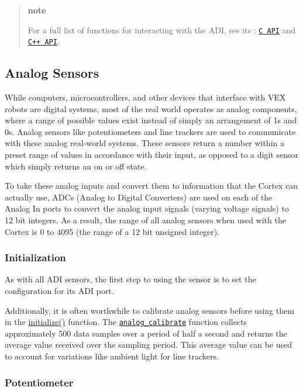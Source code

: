 \begin{quote}
{\bfseries note}

For a full list of functions for interacting with the A\+DI, see its \+: \href{../../api/c/adi.html}{\tt C A\+PI} and \href{../../api/cpp/adi.html}{\tt C++ A\+PI}. \end{quote}


\subsection*{Analog Sensors}

While computers, microcontrollers, and other devices that interface with V\+EX robots are digital systems, most of the real world operates as analog components, where a range of possible values exist instead of simply an arrangement of 1s and 0s. Analog sensors like potentiometers and line trackers are used to communicate with these analog real-\/world systems. These sensors return a number within a preset range of values in accordance with their input, as opposed to a digit sensor which simply returns an on or off state.

To take these analog inputs and convert them to information that the Cortex can actually use, A\+D\+Cs (Analog to Digital Converters) are used on each of the Analog In ports to convert the analog input signals (varying voltage signals) to 12 bit integers. As a result, the range of all analog sensors when used with the Cortex is 0 to 4095 (the range of a 12 bit unsigned integer).

\subsubsection*{Initialization}

As with all A\+DI sensors, the first step to using the sensor is to set the configuration for its A\+DI port.

Additionally, it is often worthwhile to calibrate analog sensors before using them in the {\ttfamily \hyperlink{main_8h_a9efe22aaead3a5e936b5df459de02eba}{initialize()}} function. The \href{../../api/c/adi.html#adi-analog-calibrate}{\tt analog\+\_\+calibrate} function collects approximately 500 data samples over a period of half a second and returns the average value received over the sampling period. This average value can be used to account for variations like ambient light for line trackers.

\subsubsection*{Potentiometer}

